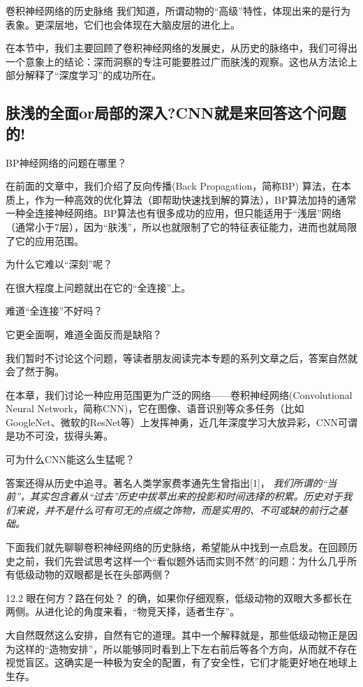 卷积神经网络的历史脉络
我们知道，所谓动物的“高级”特性，体现出来的是行为表象。更深层地，它们也会体现在大脑皮层的进化上。

在本节中，我们主要回顾了卷积神经网络的发展史，从历史的脉络中，我们可得出一个意象上的结论：深而洞察的专注可能要胜过广而肤浅的观察。这也从方法论上部分解释了“深度学习”的成功所在。

\subsection{肤浅的全面or局部的深入?CNN就是来回答这个问题的!}
BP神经网络的问题在哪里？

在前面的文章中，我们介绍了反向传播(Back Propagation，简称BP) 算法，在本质上，作为一种高效的优化算法（即帮助快速找到解的算法），BP算法加持的通常一种全连接神经网络。BP算法也有很多成功的应用，但只能适用于“浅层”网络（通常小于7层），因为“肤浅”，所以也就限制了它的特征表征能力，进而也就局限了它的应用范围。

为什么它难以“深刻”呢？

在很大程度上问题就出在它的“全连接”上。

难道“全连接”不好吗？

它更全面啊，难道全面反而是缺陷？

我们暂时不讨论这个问题，等读者朋友阅读完本专题的系列文章之后，答案自然就会了然于胸。

在本章，我们讨论一种应用范围更为广泛的网络——卷积神经网络(Convolutional Neural Network，简称CNN)，它在图像、语音识别等众多任务（比如GoogleNet、微软的ResNet等）上发挥神勇，近几年深度学习大放异彩，CNN可谓是功不可没，拔得头筹。

可为什么CNN能这么生猛呢？

答案还得从历史中追寻。著名人类学家费孝通先生曾指出[1]，
{\em 我们所谓的“当前”，其实包含着从“过去”历史中拔萃出来的投影和时间选择的积累。历史对于我们来说，并不是什么可有可无的点缀之饰物，而是实用的、不可或缺的前行之基础。}

下面我们就先聊聊卷积神经网络的历史脉络，希望能从中找到一点启发。在回顾历史之前，我们先尝试思考这样一个“看似题外话而实则不然”的问题：为什么几乎所有低级动物的双眼都是长在头部两侧？

12.2 眼在何方？路在何处？
的确，如果你仔细观察，低级动物的双眼大多都长在两侧。从进化论的角度来看，“物竞天择，适者生存”。

大自然既然这么安排，自然有它的道理。其中一个解释就是，那些低级动物正是因为这样的“造物安排”，所以能够同时看到上下左右前后等各个方向，从而就不存在视觉盲区。这确实是一种极为安全的配置，有了安全性，它们才能更好地在地球上生存。

